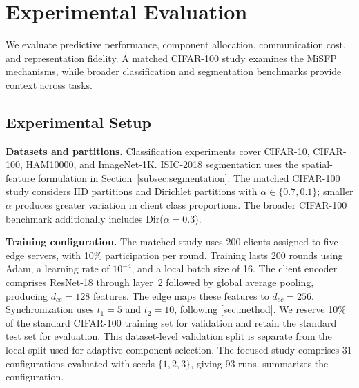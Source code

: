 \section{Experimental Evaluation}
\label{sec:experiments}

We evaluate predictive performance, component allocation, communication cost, and representation fidelity. A matched CIFAR-100 study examines the MiSFP mechanisms, while broader classification and segmentation benchmarks provide context across tasks.

\subsection{Experimental Setup}

\noindent\textbf{Datasets and partitions.} Classification experiments cover CIFAR-10, CIFAR-100, HAM10000, and ImageNet-1K. ISIC-2018 segmentation uses the spatial-feature formulation in Section~\ref{subsec:segmentation}. The matched CIFAR-100 study considers IID partitions and Dirichlet partitions with $\alpha\in\{0.7,0.1\}$; smaller $\alpha$ produces greater variation in client class proportions. The broader CIFAR-100 benchmark additionally includes Dir($\alpha=0.3$).

\noindent\textbf{Training configuration.} The matched study uses 200 clients assigned to five edge servers, with 10\% participation per round. Training lasts 200 rounds using Adam, a learning rate of $10^{-4}$, and a local batch size of 16. The client encoder comprises ResNet-18 through layer~2 followed by global average pooling, producing $d_{ce}=128$ features. The edge maps these features to $d_{ec}=256$. Synchronization uses $t_1=5$ and $t_2=10$, following \cref{sec:method}.
We reserve 10\% of the standard CIFAR-100 training set for validation and retain the standard test set for evaluation. This dataset-level validation split is separate from the local split used for adaptive component selection. The focused study comprises 31 configurations evaluated with seeds $\{1,2,3\}$, giving 93 runs.  summarizes the configuration.


